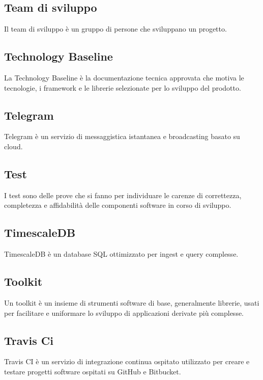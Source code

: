 
\subsection*{Team di sviluppo}
Il team di sviluppo è un gruppo di persone che sviluppano un progetto.

\subsection*{Technology Baseline}
La Technology Baseline è la documentazione tecnica approvata che motiva le tecnologie, i framework e le librerie selezionate per lo sviluppo del prodotto.

\subsection*{Telegram}
Telegram è un servizio di messaggistica istantanea e broadcasting basato su cloud.

\subsection*{Test}
I test sono delle prove che si fanno per individuare le carenze di correttezza, completezza e affidabilità delle componenti software in corso di sviluppo.

\subsection*{TimescaleDB}
TimescaleDB è un database SQL ottimizzato per ingest e query complesse.

\subsection*{Toolkit}
Un toolkit è un insieme di strumenti software di base, generalmente librerie, usati per facilitare e uniformare lo sviluppo di applicazioni derivate più complesse.

\subsection*{Travis Ci}
Travis CI è un servizio di integrazione continua ospitato utilizzato per creare e testare progetti software ospitati su GitHub e Bitbucket.

